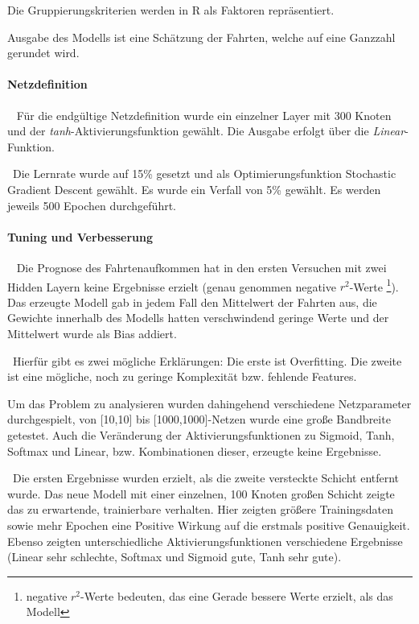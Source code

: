 Die Gruppierungskriterien werden in R als Faktoren repräsentiert. 

Ausgabe des Modells ist eine Schätzung der Fahrten, welche auf eine Ganzzahl gerundet wird. 

\paragraph{Netzdefinition} ~\newline
Für die endgültige Netzdefinition wurde ein einzelner Layer mit 300 Knoten und der \textit{tanh}-Aktivierungsfunktion gewählt. Die Ausgabe erfolgt über die \textit{Linear}-Funktion.

~\newline Die Lernrate wurde auf 15\% gesetzt und als Optimierungsfunktion Stochastic Gradient Descent gewählt. Es wurde ein Verfall von 5\% gewählt. Es werden jeweils 500 Epochen durchgeführt. 
\paragraph{Tuning und Verbesserung} ~\newline
Die Prognose des Fahrtenaufkommen hat in den ersten Versuchen mit zwei Hidden Layern keine Ergebnisse erzielt (genau genommen negative $r^2$-Werte \footnote{negative $r^2$-Werte bedeuten, das eine Gerade bessere Werte erzielt, als das Modell}). Das erzeugte Modell gab in jedem Fall den Mittelwert der Fahrten aus, die Gewichte innerhalb des Modells hatten verschwindend geringe Werte und der Mittelwert wurde als Bias addiert. 


~\newline Hierfür gibt es zwei mögliche Erklärungen: Die erste ist Overfitting. Die zweite ist eine mögliche, noch zu geringe Komplexität bzw. fehlende Features. 

Um das Problem zu analysieren wurden dahingehend verschiedene Netzparameter durchgespielt, von [10,10] bis [1000,1000]-Netzen wurde eine große Bandbreite getestet. Auch die Veränderung der Aktivierungsfunktionen zu Sigmoid, Tanh, Softmax und Linear, bzw. Kombinationen dieser, erzeugte keine Ergebnisse. 

~\newline Die ersten Ergebnisse wurden erzielt, als die zweite versteckte Schicht entfernt wurde. Das neue Modell mit einer einzelnen, 100 Knoten großen Schicht zeigte das zu erwartende, trainierbare verhalten. Hier zeigten größere Trainingsdaten sowie mehr Epochen eine Positive Wirkung auf die erstmals positive Genauigkeit. Ebenso zeigten unterschiedliche Aktivierungsfunktionen verschiedene Ergebnisse (Linear sehr schlechte, Softmax und Sigmoid gute, Tanh sehr gute). 

